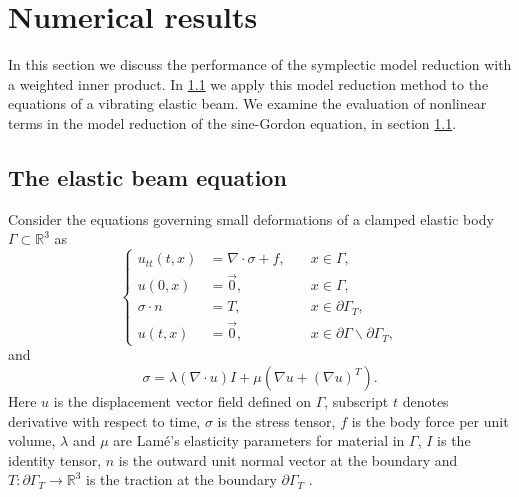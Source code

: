 \section{Numerical results} \label{sec:res}
In this section we discuss the performance of the symplectic model reduction with a weighted inner product. In \cref{sec:res.1} we apply this model reduction method to the equations of a vibrating elastic beam. We examine the evaluation of nonlinear terms in the model reduction of the sine-Gordon equation, in section \cref{sec:res.1}.

\subsection{The elastic beam equation} \label{sec:res.1}
Consider the equations governing small deformations of a clamped elastic body $\Gamma\subset \mathbb R^{3}$ as 
\begin{equation} \label{eq:res.1}
\left\{
\begin{aligned}
	u_{tt}(t,x) &= \nabla \cdot \sigma + f, \quad & x\in \Gamma, \\
	u(0,x) &= \vec 0, & x\in \Gamma,\\
	\sigma \cdot n &= T, & x \in \partial \Gamma_T,\\
	u(t,x) &= \vec 0, & x \in\partial \Gamma \backslash \partial \Gamma_T,
\end{aligned}
\right.
\end{equation}
and
\begin{equation}  \label{eq:res.2}
	\sigma = \lambda (\nabla \cdot u) I + \mu(\nabla u + (\nabla u)^T).
\end{equation}
Here $u$ is the displacement vector field defined on $\Gamma$, subscript $t$ denotes derivative with respect to time, $\sigma$ is the stress tensor, $f$ is the body force per unit volume, $\lambda$ and $\mu$ are Lam\'e's elasticity parameters for material in $\Gamma$, $I$ is the identity tensor, $n$ is the outward unit normal vector at the boundary and $T:\partial \Gamma_T \to \mathbb R^3$ is the traction at the boundary $\partial \Gamma_T$ \cite{langtangen2017solving}.

